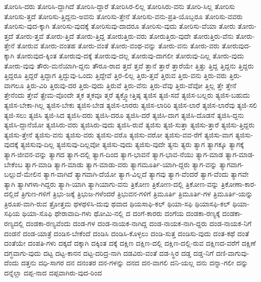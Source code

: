 {ತೋರಿಸಿ-ದರು
ತೋರಿಸಿ-ದ್ದಾಗಿದೆ
ತೋರಿಸಿ-ದ್ದಾರೆ
ತೋರಿಸಿರ-ಲಿಲ್ಲ
ತೋರಿಸಿರು-ವನು
ತೋರಿ-ಸಿಲ್ಲ
ತೋರಿಸು
ತೋರಿಸು-ತ್ತದೆ
ತೋರಿಸು-ತ್ತಿದ್ದನು-ಅವನು
ತೋರಿಸು-ತ್ತೇನೆ
ತೋರಿಸು-ವನು-ಪ್ರತಿ-ಯೊಬ್ಬರೂ
ತೋರಿಸು-ವವರು
ತೋರಿಸು-ವುದ-ಕ್ಕಾಗಿ
ತೋರಿಸು-ವುದಕ್ಕೆ
ತೋರಿಸುವು-ದಾದರೂ
ತೋರಿಸು-ವುದು
ತೋರಿಸು-ವೆಯಾ
ತೋರು
ತೋರು-ತ್ತದೆ
ತೋರು-ತ್ತವೆ
ತೋರು-ತ್ತಿದೆ
ತೋರು-ತ್ತಿದ್ದ
ತೋರುತ್ತಿರು-ವರು
ತೋರುತ್ತಿರು-ವುದೇ
ತೋರುತ್ತಿರು-ವೆನು
ತೋರು-ತ್ತೇನೆ
ತೋರುವ
ತೋರು-ವಂತಹ
ತೋರು-ವಂತೆ
ತೋರು-ವಂಥ-ವನ್ನು
ತೋರು-ವನು
ತೋರು-ವರು
ತೋರುವುದ-ಕ್ಕಾಗಿ
ತೋರುವುದ-ಕ್ಕಿಂತ
ತೋರುವು-ದಕ್ಕೆ
ತೋರುವು-ದಲ್ಲ
ತೋರುವು-ದಾಗಲೀ
ತೋರುವು-ದಿಲ್ಲ
ತೋರು-ವುದು
ತೋರು-ವುವು
ತೌರು-ಮನೆಯಾಗಿ-ದ್ದನು
ತೌರೂ-ರಾದ
ತ್ತದೆ
ತ್ತವೆ
ತ್ತಾನೆ
ತ್ತಾರೆ
ತ್ತಾರೆಯೇ
ತ್ತಿತ್ತು
ತ್ತಿದ್ದ
ತ್ತಿದ್ದನು
ತ್ತಿದ್ದರು
ತ್ತಿದ್ದರೂ
ತ್ತಿದ್ದರೆ
ತ್ತಿದ್ದಾಗ
ತ್ತಿದ್ದುವು-ಒಂದು
ತ್ತಿದ್ದೇವೆ
ತ್ತಿರ-ಲಿಲ್ಲ
ತ್ತಿರು-ತ್ತವೆ
ತ್ತಿರುವ
ತ್ತಿರು-ವನು
ತ್ತಿರು-ವರು
ತ್ತಿರು-ವಾಗಲೂ
ತ್ತಿರು-ವಿರಿ
ತ್ತಿರುವು-ದರ
ತ್ತಿರು-ವುದು
ತ್ತಿರುವೆ
ತ್ತಿರು-ವೆನು
ತ್ತಿರು-ವೆವು
ತ್ತಿರು-ವೆವೋ
ತ್ತಿಲ್ಲ
ತ್ತೇ
ತ್ತೇನೆ
ತ್ತೇನೆಂದು
ತ್ತೇವೆ
ತ್ಪ್ರೇಮ-ವೊಂದೇ
ತ್ಮಕ
ತ್ಮಕವೂ
ತ್ಮರೆ
ತ್ಯಕ್ತ್ವೋತ್ತಿಷ್ಠ
ತ್ಯಜಿಸ
ತ್ಯಜಿ-ಸದೆ
ತ್ಯಜಿಸ-ಬಲ್ಲರು
ತ್ಯಜಿಸ-ಬಹುದು
ತ್ಯಜಿಸ-ಬೇಕಾ-ಗಿಲ್ಲ
ತ್ಯಜಿಸ-ಬೇಕು
ತ್ಯಜಿಸ-ಬೇಡ
ತ್ಯಜಿಸ-ಲಾರರು
ತ್ಯಜಿಸ-ಲಾರಿರಿ
ತ್ಯಜಿಸ-ಲಾರೆ
ತ್ಯಜಿಸ-ಲಾರೆವು
ತ್ಯಜಿ-ಸಲಿ
ತ್ಯಜಿ-ಸಲು
ತ್ಯಜಿಸಿ
ತ್ಯಜಿ-ಸಿದ
ತ್ಯಜಿಸಿ-ದರು
ತ್ಯಜಿಸಿ-ದರೂ
ತ್ಯಜಿಸಿ-ದರೆ
ತ್ಯಜಿಸಿ-ದಾಗ
ತ್ಯಜಿಸಿ-ದೊಡನೆ
ತ್ಯಜಿಸಿ-ದ್ದನು
ತ್ಯಜಿಸಿ-ದ್ದಾನೆಯೋ
ತ್ಯಜಿಸಿರು-ವರು
ತ್ಯಜಿಸಿರು-ವುದು
ತ್ಯಜಿಸಿ-ರುವೆ
ತ್ಯಜಿಸು
ತ್ಯಜಿ-ಸುತ್ತಾ
ತ್ಯಜಿಸು-ತ್ತಾರೆ
ತ್ಯಜಿಸು-ತ್ತಿದ್ದರು
ತ್ಯಜಿಸು-ತ್ತೇನೆ
ತ್ಯಜಿಸು-ವನು
ತ್ಯಜಿಸು-ವರು
ತ್ಯಜಿಸು-ವರೊ
ತ್ಯಜಿಸು-ವರೋ
ತ್ಯಜಿಸು-ವವ-ರೆಗೆ
ತ್ಯಜಿಸು-ವಾಗ
ತ್ಯಜಿಸು-ವುದಕ್ಕೆ
ತ್ಯಜಿಸುವು-ದಿಲ್ಲ
ತ್ಯಜಿಸುವು-ದಿಲ್ಲವೋ
ತ್ಯಜಿಸು-ವುದು
ತ್ಯಜಿಸು-ವುದೇ
ತ್ಯನು
ತ್ಯರು
ತ್ಯಾಗ
ತ್ಯಾಗಕ್ಕೂ
ತ್ಯಾಗಕ್ಕೆ
ತ್ಯಾಗ-ಜೀವನ-ವನ್ನು
ತ್ಯಾಗದ
ತ್ಯಾಗ-ದಲ್ಲಿ
ತ್ಯಾಗ-ದಿಂದ
ತ್ಯಾಗ-ಭಾವನೆ
ತ್ಯಾಗ-ಭಾವ-ನೆಯು
ತ್ಯಾಗ-ಮಾಡ
ತ್ಯಾಗ-ಮಾಡ-ಬೇಕೆಂಬ
ತ್ಯಾಗ-ಮಾಡಿ
ತ್ಯಾಗ-ಮಾಡು
ತ್ಯಾಗ-ಮಾಡು-ವರು
ತ್ಯಾಗಮೂರ್ತಿ-ಯಾಗಿ-ದ್ದರು
ತ್ಯಾಗ-ವನ್ನು
ತ್ಯಾಗವಾಗ-ಬಲ್ಲುದೆ-ಮೇಲಿನ
ತ್ಯಾಗ-ವಾಗಿದೆ
ತ್ಯಾಗವಾಗಿ-ದೆಯೋ
ತ್ಯಾಗ-ವಿಲ್ಲದೆ
ತ್ಯಾಗವು
ತ್ಯಾಗ-ವೆಂದರೆ
ತ್ಯಾಗ-ವೆಂದು
ತ್ಯಾಗವೇ
ತ್ಯಾಗಿ
ತ್ಯಾಗಿಗಳಾ-ಗಿದ್ದರು
ತ್ಯಾಗಿ-ಯಾಗಿ
ತ್ಯಾಗಿಯಾಗು-ವನು
ತ್ರಿಕೋಣ
ತ್ರಿಕೋಣ-ದಲ್ಲಿ
ತ್ರಿಕೋಣ-ವನ್ನು
ತ್ರಿಕೋಣಾ-ಕಾರ-ದಲ್ಲಿದೆ
ತ್ರಿಗುಣ-ಗಳಿಗೆ
ತ್ರಿಭು-ಜಕ್ಕೆ
ತ್ರಿಭುಜ-ಗಳೆಂದರೆ
ತ್ರಿಭುವನ-ಗಳಿಗೆ
ತ್ರಿಮೂರ್ತಿ
ತ್ರಿಮೂರ್ತಿ-ಗಳ
ತ್ರಿಮೂರ್ತಿ-ಯನ್ನು
ತ್ರಿರೂಪ-ವಾಗಿ-ರುವ
ತ್ರೋತ್ತಮ
ಥಳಥಳಿಸಿ-ದುವು
ಥವಾದ
ಥಿಯಸಾಫಿ-ಕಲ್
ಥಿಯಾ-ಸಫಿ
ಥಿಯಾಸಫಿ-ಕಲ್
ಥಿಯಾ-ಸಫಿಯ
ಥಿಯಾ-ಸೊಫಿ
ಥೇರಾವಾದಿ-ಗಳು
ಥೋಮಿ-ನಲ್ಲಿ
ದ
ದಂಗೆ-ಕಾರರು
ದಂಗೆಯ
ದಂಡಕಾ-ರಣ್ಯಕ್ಕೆ
ದಂಡಕಾ-ರಣ್ಯದಲ್ಲಿ
ದಂಡಕಾ-ರಣ್ಯವೆಂದು
ದಂಡ-ಗಳ
ದಂಡ-ನಾಯಕ-ನಾಗಿದ್ದ
ದಂಡ-ನಾಯಕ-ನಾಗಿ-ದ್ದರು
ದಂಡ-ನಾಯಕ-ನಿಗೆ
ದಂಡನೆ
ದಂಡ-ಯಾತ್ರೆ
ದಂಡಿಸ-ಬೇಕೆಂದೆ
ದಂಡಿಸಿ
ದಂಡಿಸಿ-ಕೊಳ್ಳಲು
ದಂಡಿ-ಸುತ್ತ
ದಂಡಿಸು-ವುದು
ದಂತ-ಕಥೆ
ದಂತೆ
ದಂತೆಯೇ
ದಂಪತಿ-ಗಳು
ದಕ್ಕದೆ
ದಕ್ಕಾಗಿ
ದಕ್ಕಿಂತ
ದಕ್ಕೆ
ದಕ್ಷಿಣ
ದಕ್ಷಿಣ-ದಲ್ಲಿ
ದಕ್ಷಿಣ-ದಲ್ಲಿ-ರುವ
ದಕ್ಷಿಣದ-ವರೆಗೆ
ದಕ್ಷಿಣೆ
ದಗ್ಧವಾಗು-ವುದು
ದಟ್ಟ
ದಟ್ಟ-ಕಾನನ
ದಟ್ಟ-ದರಿದ್ರ-ನಾಗಿ
ದಡವಿರು-ವಂತೆ
ದಡ-ಸ್ಥಿರ
ದಡ್ಡ
ದಡ್ಡ-ನಿಗೆ
ದಣಿ-ವಾಗುವು-ದೆಂದು
ದತ್ತನು
ದಧಿ-ಸಾಗರ
ದನ
ದನಂತರ
ದನ-ಗಳನ್ನು
ದನದ
ದನ-ವಾಗಲಿ
ದನಿ-ಯಲ್ಲ
ದನು
ದನ್ನಾ-ಗಲೀ
ದನ್ನು
ದನ್ನೆಲ್ಲಾ
ದಪ್ಪ-ನಾದ
ದಪ್ಪವಾಗಿರು-ವುದ-ರಿಂದ
}
